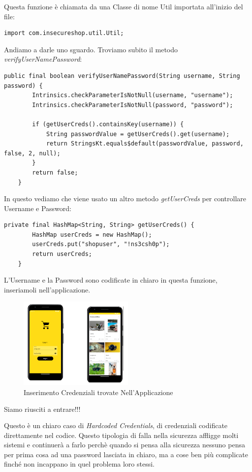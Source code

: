 \documentclass{article}
\begin{document}
Questa funzione è chiamata da una Classe di nome Util importata all'inizio del file:

\begin{lstlisting}[style=JavaStyle]
import com.insecureshop.util.Util;
\end{lstlisting}

Andiamo a darle uno sguardo. Troviamo subito il metodo \emph{verifyUserNamePassword}:
\begin{lstlisting}[style=JavaStyle]
    public final boolean verifyUserNamePassword(String username, String password) {
        Intrinsics.checkParameterIsNotNull(username, "username");
        Intrinsics.checkParameterIsNotNull(password, "password");

        if (getUserCreds().containsKey(username)) {
            String passwordValue = getUserCreds().get(username);
            return StringsKt.equals$default(passwordValue, password, false, 2, null);
        }
        return false;
    }
\end{lstlisting}
In questo vediamo che viene usato un altro metodo \emph{getUserCreds} per controllare Username e Password:
\begin{lstlisting}[style=JavaStyle]
    private final HashMap<String, String> getUserCreds() {
        HashMap userCreds = new HashMap();
        userCreds.put("shopuser", "!ns3csh0p");
        return userCreds;
    }
\end{lstlisting}
L'Username e la Password sono codificate in chiaro in questa funzione, inseriamoli nell'applicazione.
\begin{figure}[htp]
    \centering
    \includegraphics[width=0.5\textwidth]{./insecureshop/logIn.png}
    \captionsetup{labelformat=empty}
    \caption{Inserimento Credenziali trovate Nell'Applicazione}
    \label{fig:loginApp}
\end{figure}
Siamo riusciti a entrare!!!

Questo è un chiaro caso di \textit{Hardcoded Credentials}, di credenziali codificate direttamente nel codice. Questo tipologia 
di falla nella sicurezza affligge molti sistemi e continuerà a farlo perchè quando si pensa alla sicurezza nessuno pensa per prima 
cosa ad una password lasciata in chiaro, ma a cose ben più complicate finché non incappano in quel problema loro stessi. 
\end{document}
